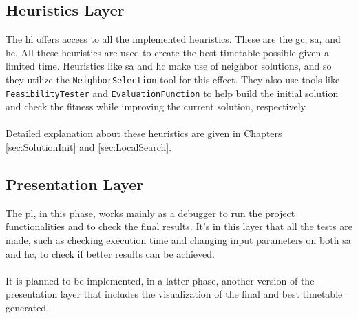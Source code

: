 \subsection{Heuristics Layer}

The \gls{hl} offers access to all the implemented heuristics. These are the \gls{gc}, \gls{sa}, and \gls{hc}. All these heuristics are used to create the best timetable possible given a limited time. Heuristics like \gls{sa} and \gls{hc} make use of neighbor solutions, and so they utilize the \verb+NeighborSelection+ tool for this effect. They also use tools like \verb+FeasibilityTester+ and \verb+EvaluationFunction+ to help build the initial solution and check the fitness while improving the current solution, respectively.\\
\\
Detailed explanation about these heuristics are given in Chapters \ref{sec:SolutionInit} and \ref{sec:LocalSearch}.

\subsection{Presentation Layer}

The \gls{pl}, in this phase, works mainly as a debugger to run the project functionalities and to check the final results. It's in this layer that all the tests are made, such as checking execution time and changing input parameters on both \gls{sa} and \gls{hc}, to check if better results can be achieved.\\
\\
It is planned to be implemented, in a latter  phase, another version of the presentation layer that includes the visualization of the final and best timetable generated.













